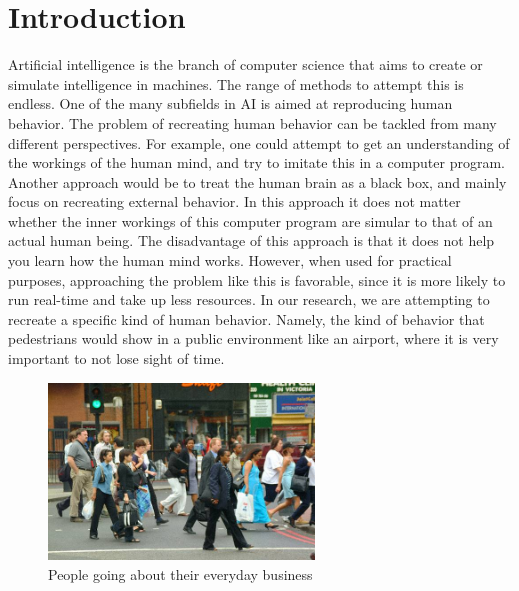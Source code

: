 \documentclass[11pt, a4paper]{book}
\begin{document}
\chapter{Introduction}
Artificial intelligence is the branch of computer science that aims to create or simulate intelligence in machines. The range of methods to attempt this is endless. One of the many subfields in AI is aimed at reproducing human behavior. The problem of recreating human behavior can be tackled from many different perspectives. For example, one could attempt to get an understanding of the workings of the human mind, and try to imitate this in a computer program. Another approach would be to treat the human brain as a black box, and mainly focus on recreating external behavior. In this approach it does not matter whether the inner workings of this computer program are simular to that of an actual human being. The disadvantage of this approach is that it does not help you learn how the human mind works. However, when used for practical purposes, approaching the problem like this is favorable, since it is more likely to run real-time and take up less resources. In our research, we are attempting to recreate a specific kind of human behavior. Namely, the kind of behavior that pedestrians would show in a public environment like an airport,  where it is very important to not lose sight of time.\\
\begin{figure}[h]
\begin{center}
\includegraphics[width=200pt]{pedestrians.jpg}
\end{center}
\caption{People going about their everyday business}
\label{pedestrianpicture}
\end{figure}
\end{document}
